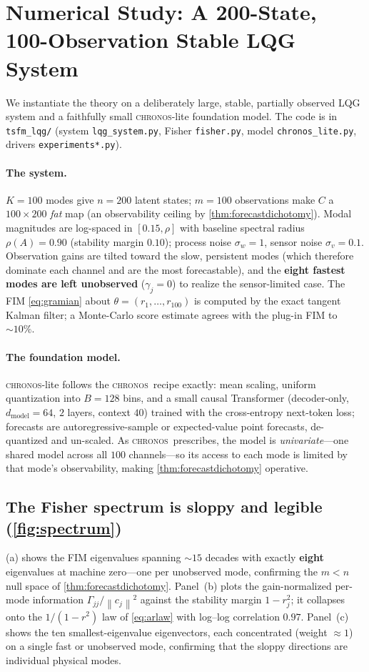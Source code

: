 \documentclass[10pt]{article}
\theoremstyle{plain}
\theoremstyle{definition}
\theoremstyle{remark}
\newcommand{\Gam}{\Gamma}
\newcommand{\norm}[1]{\left\lVert #1 \right\rVert}
\newcommand{\Chronos}{\textsc{chronos}}
\begin{document}
\section{Numerical Study: A 200-State, 100-Observation Stable LQG System}
\label{sec:experiments}

We instantiate the theory on a deliberately large, stable, partially observed
LQG system and a faithfully small \Chronos-lite foundation model. The code is in
\texttt{tsfm\_lqg/} (system \texttt{lqg\_system.py}, Fisher \texttt{fisher.py},
model \texttt{chronos\_lite.py}, drivers \texttt{experiments*.py}).

\paragraph{The system.}
$K=100$ modes give $n=200$ latent states; $m=100$ observations make $C$ a
$100\times200$ \emph{fat} map (an observability ceiling by
\cref{thm:forecastdichotomy}). Modal magnitudes are log-spaced in $[0.15,\rho]$
with baseline spectral radius $\rho(A)=0.90$ (stability margin $0.10$); process
noise $\sigma_w=1$, sensor noise $\sigma_v=0.1$. Observation gains are tilted
toward the slow, persistent modes (which therefore dominate each channel and are
the most forecastable), and the \textbf{eight fastest modes are left unobserved}
($\gamma_j=0$) to realize the sensor-limited case. The FIM
\eqref{eq:gramian} about $\theta=(r_1,\dots,r_{100})$ is computed by the exact
tangent Kalman filter; a Monte-Carlo score estimate agrees with the plug-in FIM
to $\sim\!10\%$.

\paragraph{The foundation model.}
\Chronos-lite follows the \Chronos\ recipe exactly: mean scaling, uniform
quantization into $B=128$ bins, and a small causal Transformer (decoder-only,
$d_{\text{model}}=64$, $2$ layers, context $40$) trained with the cross-entropy
next-token loss; forecasts are autoregressive-sample or expected-value point
forecasts, de-quantized and un-scaled. As \Chronos\ prescribes, the model is
\emph{univariate}---one shared model across all $100$ channels---so its access to
each mode is limited by that mode's observability, making
\cref{thm:forecastdichotomy} operative.

\subsection{The Fisher spectrum is sloppy and legible (\cref{fig:spectrum})}
(a) shows the FIM eigenvalues spanning $\sim\!15$ decades with
exactly \textbf{eight} eigenvalues at machine zero---one per unobserved mode,
confirming the $m<n$ null space of \cref{thm:forecastdichotomy}. Panel~(b) plots
the gain-normalized per-mode information $\Gam_{jj}/\norm{c_j}^2$ against the
stability margin $1-r_j^2$; it collapses onto the $1/(1-r^2)$ law of
\eqref{eq:arlaw} with log--log correlation $\mathbf{0.97}$. Panel~(c) shows the
ten smallest-eigenvalue eigenvectors, each concentrated (weight $\approx1$) on a
single fast or unobserved mode, confirming that the sloppy directions are
individual physical modes.
\end{document}
